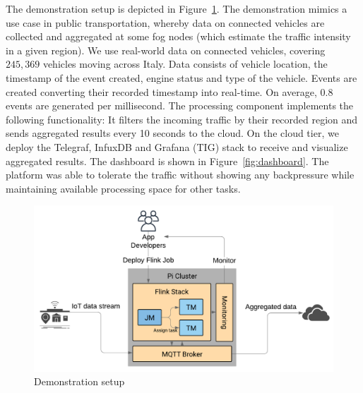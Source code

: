 The demonstration setup is depicted in Figure~\ref{fig:demo}. The demonstration mimics a use case in public transportation, whereby data on connected vehicles are collected and aggregated at some fog nodes (which estimate the traffic intensity in a given region).
We use real-world data on connected vehicles, covering $245,369$ vehicles moving across Italy. Data consists of vehicle location, the timestamp of the event created, engine status and type of the vehicle. Events are created converting their recorded timestamp into real-time. On average, $0.8$ events are generated per millisecond.
The processing component implements the following functionality: It filters the incoming traffic by their recorded region and sends aggregated results every 10 seconds to the cloud.
On the cloud tier, we deploy the Telegraf, InfuxDB and Grafana (TIG) stack to receive and visualize aggregated results. The dashboard is shown in Figure~\ref{fig:dashboard}.
The platform was able to tolerate the traffic without showing any backpressure
while maintaining available processing space for other tasks.


\begin{figure}[htbp]
\centerline{
\includegraphics[width=1\linewidth]{figures/fog_activity.pdf}}
\caption{Demonstration setup}
\label{fig:demo}
\end{figure}

